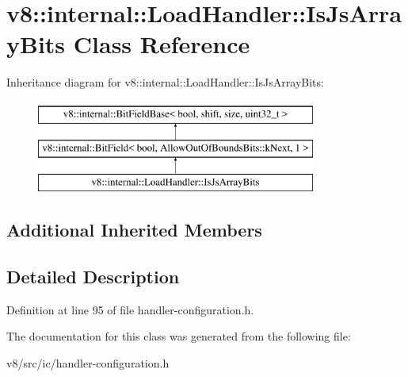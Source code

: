 \hypertarget{classv8_1_1internal_1_1LoadHandler_1_1IsJsArrayBits}{}\section{v8\+:\+:internal\+:\+:Load\+Handler\+:\+:Is\+Js\+Array\+Bits Class Reference}
\label{classv8_1_1internal_1_1LoadHandler_1_1IsJsArrayBits}
Inheritance diagram for v8\+:\+:internal\+:\+:Load\+Handler\+:\+:Is\+Js\+Array\+Bits\+:\begin{figure}[H]
\begin{center}
\leavevmode
\includegraphics[height=3.000000cm]{classv8_1_1internal_1_1LoadHandler_1_1IsJsArrayBits}
\end{center}
\end{figure}
\subsection*{Additional Inherited Members}


\subsection{Detailed Description}


Definition at line 95 of file handler-\/configuration.\+h.



The documentation for this class was generated from the following file\+:\begin{DoxyCompactItemize}
\item 
v8/src/ic/handler-\/configuration.\+h\end{DoxyCompactItemize}
